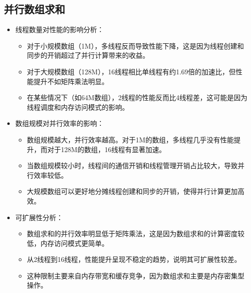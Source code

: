 \documentclass{SYSUReport}
\begin{document}
\subsection{并行数组求和}
\begin{itemize}
    \item 线程数量对性能的影响分析：
    \begin{itemize}
        \item 对于小规模数组（1M），多线程反而导致性能下降，这是因为线程创建和同步的开销超过了并行计算带来的收益。
        \item 对于大规模数组（128M），16线程相比单线程有约1.69倍的加速比，但性能提升不如矩阵乘法明显。
        \item 在某些情况下（如64M数组），2线程的性能反而比4线程差，这可能是因为线程调度和内存访问模式的影响。
    \end{itemize}
    
    \item 数组规模对并行效率的影响：
    \begin{itemize}
        \item 数组规模越大，并行效率越高。对于1M的数组，多线程几乎没有性能提升，而对于128M的数组，16线程有显著加速。
        \item 当数组规模较小时，线程间的通信开销和线程管理开销占比较大，导致并行效率较低。
        \item 大规模数组可以更好地分摊线程创建和同步的开销，使得并行计算更加高效。
    \end{itemize}
    
    \item 可扩展性分析：
    \begin{itemize}
        \item 数组求和的并行效率明显低于矩阵乘法，这是因为数组求和的计算密度较低，内存访问模式更简单。
        \item 从2线程到16线程，性能提升呈现不稳定的趋势，说明其可扩展性较差。
        \item 这种限制主要来自内存带宽和缓存竞争，因为数组求和主要是内存密集型操作。
    \end{itemize}
\end{itemize}
\end{document}
